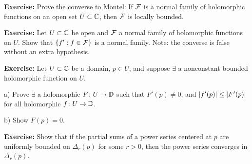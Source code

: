 \documentclass[10pt,aspectratio=169]{beamer}
\begin{document}
\begin{frame}
\textbf{Exercise:}
Prove the converse to Montel:
If ${\mathcal{F}}$ is a normal family of holomorphic functions on an open set $U \subset {\mathbb{C}}$,
then ${\mathcal{F}}$ is locally bounded.

\pause
\medskip

\textbf{Exercise:}
Let $U \subset {\mathbb{C}}$ be open and ${\mathcal{F}}$ a normal family of
holomorphic functions on $U$.
Show that $\{ f' : f \in {\mathcal{F}} \}$ is a normal family.
\pause
Note: the converse is false without an extra hypothesis.

\pause
\medskip

\textbf{Exercise:}
Let $U \subset {\mathbb{C}}$ be a domain, $p \in U$,
and suppose $\exists$ a nonconstant
bounded holomorphic function on $U$.

\pause
a)
Prove $\exists$ a holomorphic $F \colon U \to {\mathbb{D}}$
such that
$F'(p) \not= 0$, and
$\lvert {f'(p)} \rvert \leq \lvert {F'(p)} \rvert$
for all holomorphic
$f \colon U \to {\mathbb{D}}$.

\pause
b)
Show
$F(p) = 0$.

\medskip
\pause

\textbf{Exercise:}
Show that if the partial sums of a power series centered at $p$
are uniformly bounded on $\Delta_r(p)$ for some $r > 0$,
then the power series converges in $\Delta_r(p)$.


\end{frame}
\end{document}
